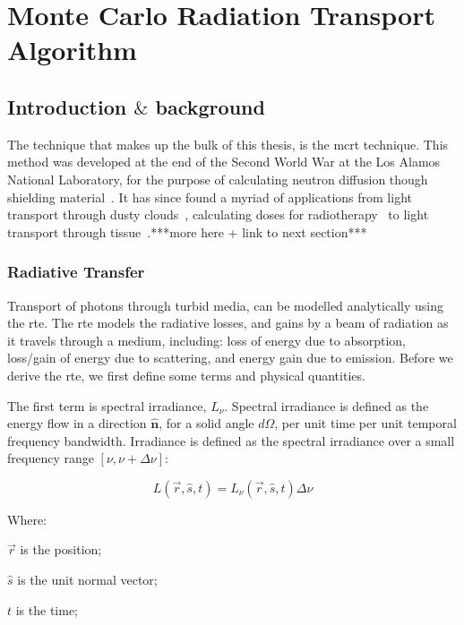 \section{Monte Carlo Radiation Transport Algorithm}

\subsection{Introduction \texorpdfstring{$\&$}{and} background}
The technique that makes up the bulk of this thesis, is the \gls{mcrt} technique. This method was developed at the end of the Second World War at the Los Alamos National Laboratory, for the purpose of calculating neutron diffusion though shielding material~\cite{montybeg1,eckhardt1987stan,anderson1986metropolis,ulam1947statistical}. It has since found a myriad of applications from light transport through dusty clouds~\cite{wood1999model}, calculating doses for radiotherapy~\cite{rogers1995beam} to light transport through tissue~\cite{1stmonty}.***more here + link to next section***



\subsubsection*{Radiative Transfer}
Transport of photons through turbid media, can be modelled analytically using the \gls{rte}. The \gls{rte} models the radiative losses, and gains by a beam of radiation as it travels through a medium, including: loss of energy due to absorption, loss/gain of energy due to scattering, and energy gain due to emission. Before we derive the \gls{rte}, we first define some terms and physical quantities.


The first term is spectral irradiance, $L_\nu$. Spectral irradiance is defined as the energy flow in a direction $\mathbf{\hat{n}}$, for a solid angle $d\Omega$, per unit time per unit temporal frequency bandwidth.	
Irradiance is defined as the spectral irradiance over a small frequency range $[\nu, \nu+\Delta \nu]$:

\begin{equation}
	L(\vec{r},\hat{s},t) = L_{\nu}(\vec{r},\hat{s},t)\Delta \nu	
\end{equation}

\noindent Where:

\indent $\vec{r}$ is the position;

\indent $\hat{s}$ is the unit normal vector;

\indent $t$ is the time;

